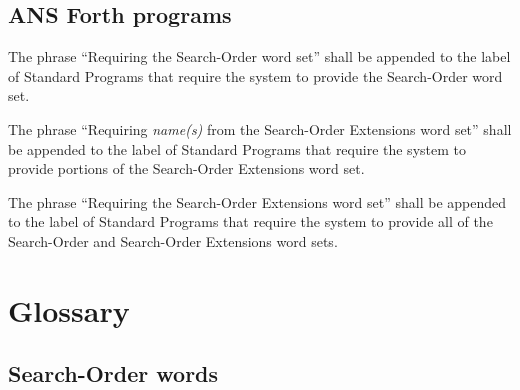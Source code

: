 \cbstart{}
\subsection[Forth programs]{ANS Forth programs} %
\cbend

The phrase ``Requiring the Search-Order word set'' shall be appended
to the label of Standard Programs that require the system to provide
the Search-Order word set.

The phrase ``Requiring \emph{name(s)} from the Search-Order
Extensions word set'' shall be appended to the label of Standard
Programs that require the system to provide portions of the
Search-Order Extensions word set.

The phrase ``Requiring the Search-Order Extensions word set'' shall
be appended to the label of Standard Programs that require the system
to provide all of the Search-Order and Search-Order Extensions word
sets.


\section{Glossary} %

\subsection{Search-Order words} %

